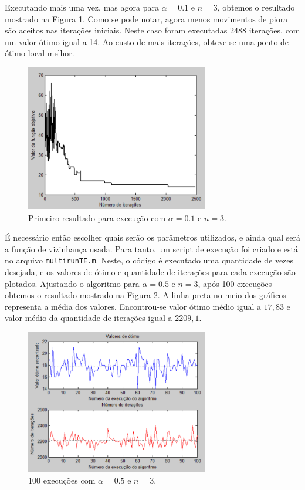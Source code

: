 \documentclass[conference]{IEEEtran}
\begin{document}
Executando mais uma vez, mas agora para $\alpha = 0.1$ e $n = 3$, obtemos o resultado mostrado na Figura \ref{fig:result-2}. Como se pode notar, agora menos movimentos de piora são aceitos nas iterações iniciais. Neste caso foram executadas 2488 iterações, com um valor ótimo igual a 14. Ao custo de mais iterações, obteve-se uma ponto de ótimo local melhor.

	\begin{figure}[h]
		\centering
		\includegraphics[width=8cm]{img/result-2.png}
		\caption{Primeiro resultado para execução com $\alpha = 0.1$ e $n = 3$.}
		\label{fig:result-2}
	\end{figure}

É necessário então escolher quais serão os parâmetros utilizados, e ainda qual será a função de vizinhança usada. Para tanto, um script de execução foi criado e está no arquivo \texttt{multirunTE.m}. Neste, o código é executado uma quantidade de vezes desejada, e os valores de ótimo e quantidade de iterações para cada execução são plotados. Ajustando o algoritmo para $\alpha = 0.5$ e $n = 3$, após 100 execuções obtemos o resultado mostrado na Figura \ref{fig:mult-result-1}. A linha preta no meio dos gráficos representa a média dos valores. Encontrou-se valor ótimo médio igual a $17,83$ e valor médio da quantidade de iterações igual a $2209,1$.

	\begin{figure}[h]
		\centering
		\includegraphics[width=8cm]{img/mult-result-1.png}
		\caption{100 execuções com $\alpha = 0.5$ e $n = 3$.}
		\label{fig:mult-result-1}
	\end{figure}
\end{document}
